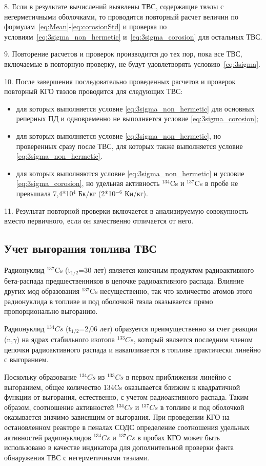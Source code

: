 8. Если в результате вычислений выявлены ТВС, содержащие твэлы с
негерметичными оболочками, то проводится повторный расчет величин по формулам~\ref{eq:Mean}-\ref{eq:corosionStd} и проверка по условиям~\ref{eq:3sigma_non_hermetic} и~\ref{eq:3sigma_corosion} для остальных ТВС.

9. Повторение расчетов и проверок производится до тех пор, пока все ТВС, включаемые в повторную проверку, не будут удовлетворять условию~\ref{eq:3sigma}.

10. После завершения последовательно проведенных расчетов и проверок
повторный КГО твэлов проводится для следующих ТВС:
\begin{itemize}
	\item для которых выполняется условие \ref{eq:3sigma_non_hermetic} для основных реперных ПД и одновременно не выполняется условие \ref{eq:3sigma_corosion};
	\item для которых выполняется условие \ref{eq:3sigma_non_hermetic}, но проверенных сразу после ТВС, для которых также выполняется условие \ref{eq:3sigma_non_hermetic}.
	\item для которых выполняются условие \ref{eq:3sigma_non_hermetic} и условие \ref{eq:3sigma_corosion}, но удельная активность $^{134}$Cs и $^{137}$Cs в пробе не превышала 7,4*10$^{4}$ Бк/кг
	(2*10$^{-6}$ Ки/кг).
\end{itemize}

11. Результат повторной проверки включается в анализируемую совокупность вместо первичного, если он качественно отличается от него. 

\subsection{Учет выгорания топлива ТВС}

Радионуклид $^{137}$Cs (t$_{1/2}$=30 лет) является конечным продуктом
радиоактивного бета-распада предшественников в цепочке радиоактивного
распада. Влияние других мод образования $^{137}$Cs несущественно, так что
количество атомов этого радионуклида в топливе и под оболочкой твэла
оказывается прямо пропорционально выгоранию.

Радионуклид $^{134}Cs$ (t$_{1/2}$=2,06 лет) образуется преимущественно за счет реакции (n,$\gamma$) на ядрах стабильного изотопа $^{133}Cs$, который является последним членом цепочки радиоактивного распада и накапливается в топливе практически линейно с выгоранием.

Поскольку образование $^{134}Cs$ из $^{133}Cs$ в первом приближении линейно с выгоранием, общее количество 134Cs оказывается близким к квадратичной функции от выгорания, естественно, с учетом радиоактивного распада. Таким образом, соотношение активностей $^{134}Cs$ и $^{137}Cs$ в топливе и под оболочкой оказывается значимо зависящим от выгорания.
При проведении КГО на остановленном реакторе в пеналах СОДС
определение соотношения удельных активностей радионуклидов $^{134}Cs$ и $^{137}Cs$ в пробах КГО может быть использовано в качестве индикатора для дополнительной проверки факта обнаружения ТВС с негерметичными твэлами.


